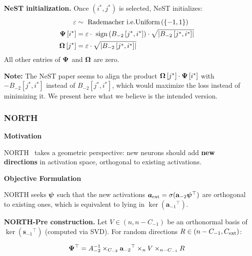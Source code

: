 \begin{proposition}\label{prop:nest_init}

\textbf{NeST initialization.} Once \(\left( i^{\ast},j^{\ast} \right)\)
is selected, NeST initializes: \[\begin{aligned}
\varepsilon & \sim \text{ Rademacher }\text{i.e.}\text{Uniform}\left( \left\{ - 1,1 \right\} \right) \\
\boldsymbol{\Psi}{}\left\lbrack i^{\ast} \right\rbrack & = \varepsilon \cdot \text{ sign}\left( B_{- 2}\left\lbrack j^{\ast},i^{\ast} \right\rbrack \right) \cdot \sqrt{\left| {B_{- 2}\left\lbrack j^{\ast},i^{\ast} \right\rbrack} \right|} \\
\boldsymbol{\Omega}{}\left\lbrack j^{\ast} \right\rbrack & = \varepsilon \cdot \sqrt{\left| {B_{- 2}\left\lbrack j^{\ast},i^{\ast} \right\rbrack} \right|}
\end{aligned}\]
All other entries of \(\boldsymbol{\Psi}{}\) and \(\boldsymbol{\Omega}{}\) are zero.

\textbf{Note:} The NeST paper seems to align the product
\(\boldsymbol{\Omega}{}\left\lbrack j^{\ast} \right\rbrack \cdot \boldsymbol{\Psi}{}\left\lbrack i^{\ast} \right\rbrack\)
with \(- B_{- 2}\left\lbrack j^{\ast},i^{\ast} \right\rbrack\) instead
of \(B_{- 2}\left\lbrack j^{\ast},i^{\ast} \right\rbrack\), which would
maximize the loss instead of minimizing it. We present here what we
believe is the intended version.

\end{proposition}

\subsubsection{NORTH}

\textbf{Motivation}

NORTH~\citep{maile_when_2022} takes a geometric perspective:
new neurons should add \textbf{new directions} in activation space,
orthogonal to existing activations.

\textbf{Objective Formulation}

NORTH seeks \(\boldsymbol{\psi}{}\) such that the new activations
\(\boldsymbol{a_{\text{ext}}} = \sigma(\mathbf{a}_{- 2}\boldsymbol{\psi}{}^{\top})\) are orthogonal
to existing ones, which is equivalent to lying in
\(\ker({\mathbf{a}_{- 1}}^{\top})\).

\begin{proposition}\label{prop:north_construction}

\textbf{NORTH-Pre construction.} Let
\(V \in \left( n,n - C_{- 1} \right)\) be an orthonormal basis of
\(\ker({\mathbf{s}_{- 1}}^{\top})\) (computed via SVD). For random
directions \(R \in \left( n - C_{- 1},C_{\text{ext}} \right)\):

\begin{equation}\label{eq:north_proposition}
\boldsymbol{\Psi}{}^{\top} = A_{- 2}^{- 1} \times_{C_{- 2}}{\mathbf{a}_{- 2}}^{\top} \times_{n}V \times_{n - C_{- 1}}R
\end{equation}

\end{proposition}

